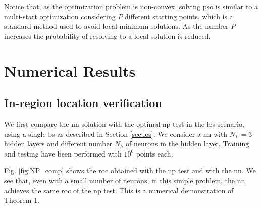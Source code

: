 \documentclass[conference,draftcls,onecolumn]{IEEEtran}
\begin{document}


      
    

Notice that, as the optimization problem is non-convex, solving \ac{pso} is similar to a multi-start optimization considering $P$ different starting points, which is a standard method used to avoid local minimum solutions. As the number $P$ increases the probability of resolving to a local solution is reduced.

\section{Numerical Results}\label{sec: nr}
\subsection{In-region location verification}
We first compare the \ac{nn} solution with the optimal \ac{np} test in the \ac{los} scenario, using a single \ac{bs} as described in Section \ref{sec:los}. We consider a \ac{nn} with $N_L=3$ hidden layers and different number $N_h$ of neurons in the hidden layer. Training and testing have been performed with $10^6$ points each. 

Fig. \ref{fig:NP_comp} shows the \ac{roc} obtained with the \ac{np} test and with the \ac{nn}. We see that, even with a small number of neurons, in this simple problem, the \ac{nn} achieves the same \ac{roc} of the \ac{np} test. This is a numerical demonstration of Theorem 1.
\end{document}
